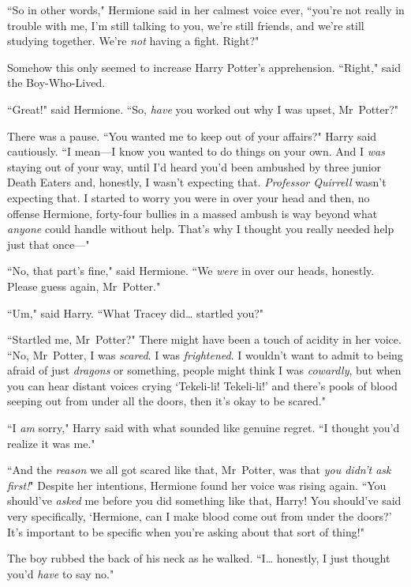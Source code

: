 ``So in other words," Hermione said in her calmest voice ever, ``you're not really in trouble with me, I'm still talking to you, we're still friends, and we're still studying together. We're \emph{not} having a fight. Right?"

Somehow this only seemed to increase Harry Potter's apprehension. ``Right," said the Boy-Who-Lived.

``Great!" said Hermione. ``So, \emph{have} you worked out why I was upset, Mr~Potter?"

There was a pause. ``You wanted me to keep out of your affairs?" Harry said cautiously. ``I mean—I know you wanted to do things on your own. And I \emph{was} staying out of your way, until I'd heard you'd been ambushed by three junior Death Eaters and, honestly, I wasn't expecting that. \emph{Professor Quirrell} wasn't expecting that. I started to worry you were in over your head and then, no offense Hermione, forty-four bullies in a massed ambush is way beyond what \emph{anyone} could handle without help. That's why I thought you really needed help just that once—"

``No, that part's fine," said Hermione. ``We \emph{were} in over our heads, honestly. Please guess again, Mr~Potter."

``Um," said Harry. ``What Tracey did{\ldots} startled you?"

``Startled me, Mr~Potter?" There might have been a touch of acidity in her voice. ``No, Mr~Potter, I was \emph{scared}. I was \emph{frightened}. I wouldn't want to admit to being afraid of just \emph{dragons} or something, people might think I was \emph{cowardly}, but when you can hear distant voices crying `Tekeli-li! Tekeli-li!' and there's pools of blood seeping out from under all the doors, then it's okay to be scared."

``I \emph{am} sorry," Harry said with what sounded like genuine regret. ``I thought you'd realize it was me."

``And the \emph{reason} we all got scared like that, Mr~Potter, was that \emph{you didn't ask first!}" Despite her intentions, Hermione found her voice was rising again. ``You should've \emph{asked} me before you did something like that, Harry! You should've said very specifically, `Hermione, can I make blood come out from under the doors?' It's important to be specific when you're asking about that sort of thing!"

The boy rubbed the back of his neck as he walked. ``I{\ldots} honestly, I just thought you'd \emph{have} to say no."

